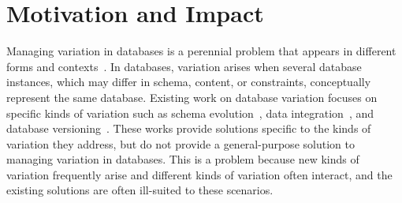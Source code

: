 \section{Motivation and Impact}
\label{sec:mot}

Managing variation in databases is a perennial problem that appears in
different forms and
contexts~\cite{curateVdata,ALW21vamos,ready17cidr,clams16sigmod,datahub15cidr}.
%
In databases, variation arises when several database instances, which may
differ in schema, content, or constraints, conceptually represent the same
database.
%
%
Existing work on database variation focuses on specific kinds of variation such
as schema evolution~\cite{SchEvolRA90McKenzie, schVersioning97Castro,
tempSchEvol91Ariav, tsql95Snodgrass, prima08Moon}, data
integration~\cite{dataIntegBook}, and database
versioning~\cite{datasetVersioning,dbVersioning}. These works provide solutions
specific to the kinds of variation they address, but do not provide a
general-purpose solution to managing variation in databases.
%
This is a problem because new kinds of variation frequently arise and different
kinds of variation often interact, and the existing solutions are often
ill-suited to these scenarios.




